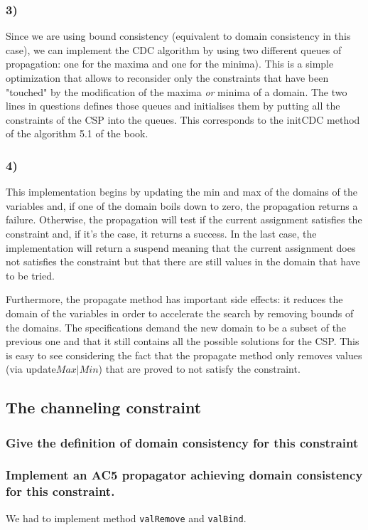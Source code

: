 \documentclass[a4paper ,12pt,french]{article}
\begin{document}
\subsubsection{3)}
Since we are using bound consistency (equivalent to domain consistency in this case), we can implement the CDC algorithm by using two different queues of propagation: one for the maxima and one for the minima). This is a simple optimization that allows to reconsider only the constraints that have been "touched" by the modification of the maxima \textit{or} minima of a domain. The two lines in questions defines those queues and initialises them by putting all the constraints of the CSP into the queues. This corresponds to the initCDC method of the algorithm 5.1 of the book.
\subsubsection{4)}
This implementation begins by updating the min and max of the domains of the variables and, if one of the domain boils down to zero, the propagation returns a failure. Otherwise, the propagation will test if the current assignment satisfies the constraint and, if it's the case, it returns a success. 
In the last case, the implementation will return a suspend meaning that the current assignment does not satisfies the constraint but that there are still values in the domain that have to be tried. 

Furthermore, the propagate method has important side effects: it reduces the domain of the variables in order to accelerate the search by removing bounds of the domains. The specifications demand the new domain to be a subset of the previous one and that it still contains all the possible solutions for the CSP. This is easy to see considering the fact that the propagate method only removes values (via update$Max\vert Min$) that are proved to not satisfy the constraint.


\subsection{The channeling constraint}
\subsubsection{Give the definition of domain consistency for this constraint}
\subsubsection{Implement an AC5 propagator achieving domain consistency for this constraint.}
We had to implement method \texttt{valRemove} and \texttt{valBind}.
\end{document}
